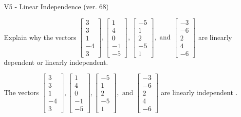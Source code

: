 \begin{exercise}
  \begin{exerciseTitle}V5 - Linear Independence (ver. 68)\end{exerciseTitle}
  \begin{exerciseStatement}
    Explain why the vectors \(\left[\begin{array}{r}
3 \\
3 \\
1 \\
-4 \\
3
\end{array}\right] , \left[\begin{array}{r}
1 \\
4 \\
0 \\
-1 \\
-5
\end{array}\right] , \left[\begin{array}{r}
-5 \\
1 \\
2 \\
-5 \\
1
\end{array}\right] , \text{ and } \left[\begin{array}{r}
-3 \\
-6 \\
2 \\
4 \\
-6
\end{array}\right]\) are linearly dependent or linearly independent.	


  \end{exerciseStatement}
  \begin{exerciseAnswer}
   The vectors \(\left[\begin{array}{r}
3 \\
3 \\
1 \\
-4 \\
3
\end{array}\right] , \left[\begin{array}{r}
1 \\
4 \\
0 \\
-1 \\
-5
\end{array}\right] , \left[\begin{array}{r}
-5 \\
1 \\
2 \\
-5 \\
1
\end{array}\right] , \text{ and } \left[\begin{array}{r}
-3 \\
-6 \\
2 \\
4 \\
-6
\end{array}\right]\) are 
  	 linearly independent  .
  


  \end{exerciseAnswer}
\end{exercise}